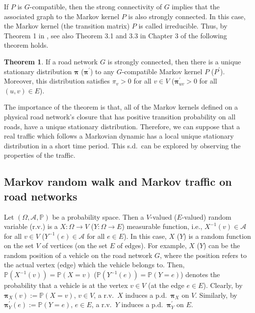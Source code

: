 \documentclass[b5paper,12pt]{report}
\theoremstyle{definition}
\newtheorem{Thm}{Theorem}
\newcommand{\bpi}{\boldsymbol{\pi}}
\newcommand{\PP}{\mathbb{P}}
\begin{document}
If $P$ is $G$-compatible, then the strong connectivity of $G$ implies that the associated graph to the Markov kernel $P$ is also strongly connected. In this case, the Markov kernel (the transition matrix) $P$ is called irreducible. Thus, by Theorem 1 in \cite{jarvis1999graph}, see also Theorem 3.1 and 3.3 in Chapter 3 of \cite{Bremaud1999} the following theorem holds.

\begin{Thm}\label{statsol}
If a road network $G$ is strongly connected, then there is a unique stationary distribution $\bpi$ ($\bpi^\prime$) to any $G$-compatible Markov kernel $P$ ($P^\prime$). Moreover, this distribution satisfies $\pi_v>0$ for all $v\in V$ ($\bpi^\prime_{uv} >0$ for all $(u,v)\in E$).
\end{Thm}

The importance of the theorem is that, all of the Markov kernels defined on a physical road network's closure that has positive transition probability on all roads, have a unique stationary distribution. Therefore, we can suppose that a real traffic which follows a Markovian dynamic has a local unique stationary distribution in a short time period. This s.d.~can be explored by observing the properties of the traffic.

\subsection{Markov random walk and Markov traffic on road networks} 
\label{Markov_traffic}

Let $(\Omega,\mathcal{A},\PP)$ be a probability space. Then a $V$-valued ($E$-valued) random variable (r.v.) is a $X:\Omega\to V$ ($Y:\Omega\to E$) measurable function, i.e., $X^{-1}(v)\in\mathcal{A}$ for all $v\in V$ ($Y^{-1}(e)\in\mathcal{A}$ for all $e\in E$). In this case, $X$ ($Y$) is a random function on the set $V$ of vertices (on the set $E$ of edges). For example, $X$ ($Y$) can be the random position of a vehicle on the road network $G$, where the position refers to the actual vertex (edge) which the vehicle belongs to. Then, $\PP(X^{-1}(v))=\PP(X=v)$ ($\PP(Y^{-1}(e))=\PP(Y=e)$) denotes the probability that a vehicle is at the vertex $v\in V$ (at the edge $e\in E$). Clearly, by $\bpi_X(v):= \PP(X=v)$, $v\in V$, a r.v.~$X$ induces a p.d.~$\bpi_X$ on $V$. Similarly, by $\bpi^\prime_Y(e):= \PP(Y=e)$, $e\in E$, a r.v.~$Y$ induces a p.d.~$\bpi^\prime_Y$ on $E$. 
\end{document}
